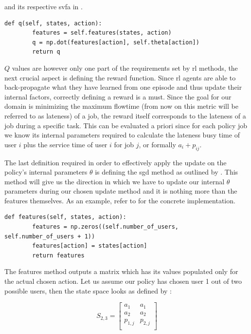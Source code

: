 \documentclass[draft=false]{seal_thesis}
\begin{document}
and its respective \gls{svfa} in .

\begin{lstlisting}[caption=\glsentryfull{svfa},label=lst:value_f_approx,style=CustomPython]
    def q(self, states, action):
        features = self.features(states, action)
        q = np.dot(features[action], self.theta[action])
        return q
\end{lstlisting}
 
 $Q$ values are however only one part of the requirements set by \gls{rl} methods, the next crucial aspect is defining the reward function. Since \gls{rl} agents are able to back-propagate what they have learned from one episode and thus update their internal factors, correctly defining a reward is a must. Since the goal for our domain is minimizing the maximum flowtime (from now on this metric will be referred to as lateness) of a job, the reward itself corresponds to the lateness of a job during a specific task. This can be evaluated a priori since for each policy job we know its internal parameters required to calculate the lateness \ie busy time of user $i$ plus the service time of user $i$ for job $j$, or formally $a_i+p_{ij}$.

 The last definition required in order to effectively apply the update on the policy's internal parameters $\theta$ is defining the \gls{sgd} method as outlined by . This method will give us the direction in which we have to update our internal $\theta$ parameters during our chosen update method and it is nothing more than the features themselves. As an example, refer to  for the concrete implementation.

 \begin{lstlisting}[caption=Features definition,label=lst:features_definition,style=CustomPython]
    def features(self, states, action):
        features = np.zeros((self.number_of_users, self.number_of_users + 1))
        features[action] = states[action]
        return features
\end{lstlisting}

The features method outputs a matrix which has its values populated only for the actual chosen action. Let us assume our policy has chosen user 1 out of two possible users, then the state space looks as defined by :

\begin{equation}
\label{eq:kbatch_sp_ex}
	S_{2,3} = 
	\begin{bmatrix}
	a_1 & a_1 \\
	a_2 & a_2 \\
	p_{1,j} & p_{2,j} \\
	\end{bmatrix}
\end{equation}
\end{document}
